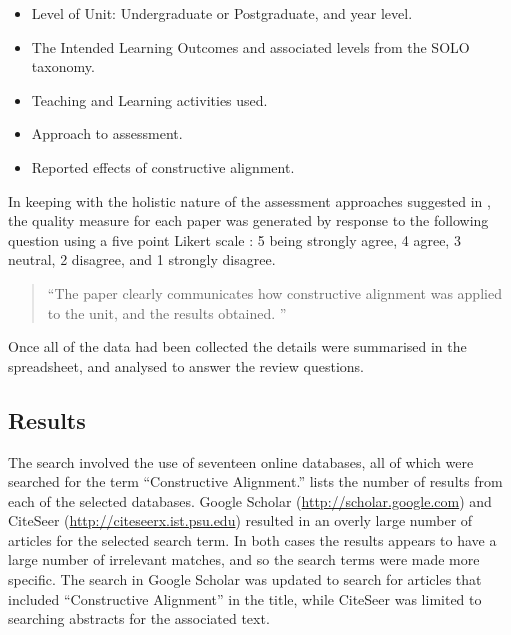 \begin{itemize}[noitemsep,nolistsep]
	\item Level of Unit: Undergraduate or Postgraduate, and year level.
	\item The Intended Learning Outcomes and associated levels from the SOLO taxonomy.
	\item Teaching and Learning activities used.
	\item Approach to assessment.
	\item Reported effects of constructive alignment.
\end{itemize}

In keeping with the holistic nature of the assessment approaches suggested in \cite{Biggs:1997}, the quality measure for each paper was generated by response to the following question using a five point Likert scale \cite{Likert:1932}: 5 being strongly agree, 4 agree, 3 neutral, 2 disagree, and 1 strongly disagree.

\begin{quote}
``The paper clearly communicates how constructive alignment was applied to the unit, and the results obtained. ''	
\end{quote}

Once all of the data had been collected the details were summarised in the spreadsheet, and analysed to answer the review questions.



\clearpage
\subsection{Results} %
\label{sub:review_results}

The search involved the use of seventeen online databases, all of which were searched for the term ``Constructive Alignment.''  lists the number of results from each of the selected databases. Google Scholar (\url{http://scholar.google.com}) and CiteSeer (\url{http://citeseerx.ist.psu.edu}) resulted in an overly large number of articles for the selected search term. In both cases the results appears to have a large number of irrelevant matches, and so the search terms were made more specific. The search in Google Scholar was updated to search for articles that included ``Constructive Alignment'' in the title, while CiteSeer was limited to searching abstracts for the associated text.

